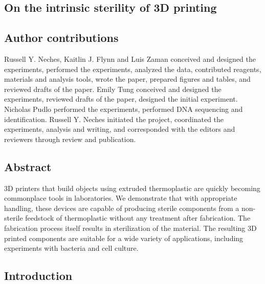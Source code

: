 \begin{refsection}

\chapter{On the intrinsic sterility of 3D printing}



\section{Author contributions}

Russell Y. Neches, Kaitlin J. Flynn and Luis Zaman conceived and designed the experiments, performed the experiments, analyzed the data, contributed reagents, materials and analysis tools, wrote the paper, prepared figures and tables, and reviewed drafts of the paper. Emily Tung conceived and designed the experiments, reviewed drafts of the paper, designed the initial experiment. Nicholas Pudlo performed the experiments, performed DNA sequencing and identification. Russell Y. Neches initiated the project, coordinated the experiments, analysis and writing, and corresponded with the editors and reviewers through review and publication.

\section{Abstract} 

3D printers that build objects using extruded thermoplastic are
quickly becoming commonplace tools in laboratories. We demonstrate
that with appropriate handling, these devices are capable of producing
sterile components from a non-sterile feedstock of thermoplastic
without any treatment after fabrication. The fabrication process
itself results in sterilization of the material. The resulting 3D
printed components are suitable for a wide variety of applications,
including experiments with bacteria and cell culture.

\section{Introduction}


\end{refsection}
